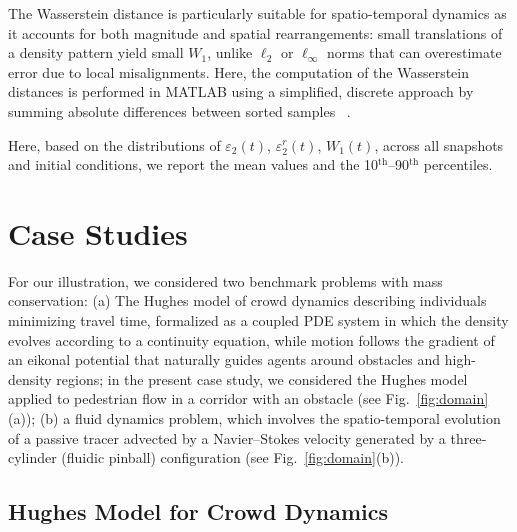 \documentclass{article}
\begin{document}
The Wasserstein distance is particularly suitable for spatio-temporal dynamics as it accounts for both magnitude and spatial rearrangements: small translations of a density pattern yield small $W_1$, unlike \(\ell_2\) or \(\ell_\infty\) norms that can overestimate error due to local misalignments. Here, the computation of the Wasserstein distances is performed in MATLAB using a simplified, discrete approach by summing absolute differences between sorted samples ~\cite{wesserstein}.

Here, based on the distributions of $\varepsilon_2(t)$,  $\varepsilon^r_2(t)$, $W_1(t)$,  across all snapshots and initial conditions, we report the mean values and the 10$^{\text{th}}$–90$^{\text{th}}$ percentiles. %


\section{Case Studies}
\label{sec:casestudies}

For our illustration, we considered two benchmark problems with mass conservation: (a) The Hughes model of crowd dynamics describing individuals minimizing travel time, formalized as a coupled PDE system in which the density evolves according to a continuity equation, while motion follows the gradient of an eikonal potential that naturally guides agents around obstacles and high-density regions; in the present case study, we considered the Hughes model applied to pedestrian flow in a corridor with an obstacle (see Fig.~\ref{fig:domain}(a));  (b) a fluid dynamics problem, which involves the spatio-temporal evolution of a passive tracer advected by a Navier–Stokes velocity generated by a three-cylinder (fluidic pinball) configuration (see Fig.~\ref{fig:domain}(b)).

\subsection{Hughes Model for Crowd Dynamics}
\label{sec:layout}
\end{document}

